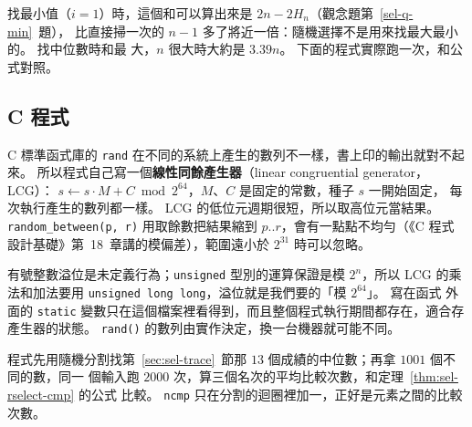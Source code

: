 找最小值（$i = 1$）時，這個和可以算出來是 $2n - 2H_n$（觀念題第~\ref{sel-q-min}~題），
比直接掃一次的 $n - 1$ 多了將近一倍：隨機選擇不是用來找最大最小的。 找中位數時和最
大，$n$ 很大時大約是 $3.39n$。 下面的程式實際跑一次，和公式對照。

\subsection{C 程式}

C 標準函式庫的 \texttt{rand} 在不同的系統上產生的數列不一樣，書上印的輸出就對不起來。
所以程式自己寫一個\textbf{線性同餘產生器}（linear congruential generator，LCG）：
$s \gets s \cdot M + C \bmod 2^{64}$，$M$、$C$ 是固定的常數，種子 $s$ 一開始固定，
每次執行產生的數列都一樣。 LCG 的低位元週期很短，所以取高位元當結果。
\texttt{random\_between(p, r)} 用取餘數把結果縮到 $p..r$，會有一點點不均勻（《C 程式
設計基礎》第~18~章講的模偏差），範圍遠小於 $2^{31}$ 時可以忽略。

\begin{cbookrecap}[第~13~章 13.1、13.5 節，第~18~章 18.8 節]
有號整數溢位是未定義行為；\texttt{unsigned} 型別的運算保證是模 $2^n$，所以 LCG 的乘
法和加法要用 \texttt{unsigned long long}，溢位就是我們要的「模 $2^{64}$」。 寫在函式
外面的 \texttt{static} 變數只在這個檔案裡看得到，而且整個程式執行期間都存在，適合存
產生器的狀態。 \texttt{rand()} 的數列由實作決定，換一台機器就可能不同。
\end{cbookrecap}

程式先用隨機分割找第~\ref{sec:sel-trace}~節那 $13$ 個成績的中位數；再拿 $1001$ 個不同的數，同一
個輸入跑 $2000$ 次，算三個名次的平均比較次數，和定理~\ref{thm:sel-rselect-cmp} 的公式
比較。 \texttt{ncmp} 只在分割的迴圈裡加一，正好是元素之間的比較次數。

